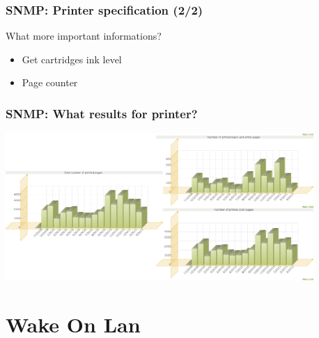 \documentclass{beamer}
\begin{document}
\begin{frame}
    \frametitle{SNMP: Printer specification (2/2)}

    \begin{block}{What more important informations?}
    \begin{itemize}
    \item Get cartridges ink level
    \item Page counter
    \end{itemize}
    \end{block}
\end{frame}

\begin{frame}
    \frametitle{SNMP: What results for printer?}

    \begin{center}
    \includegraphics[width=11.7cm]{./pics/printer_graph.png}
    \end{center}
\end{frame}

\section{Wake On Lan}
\end{document}
